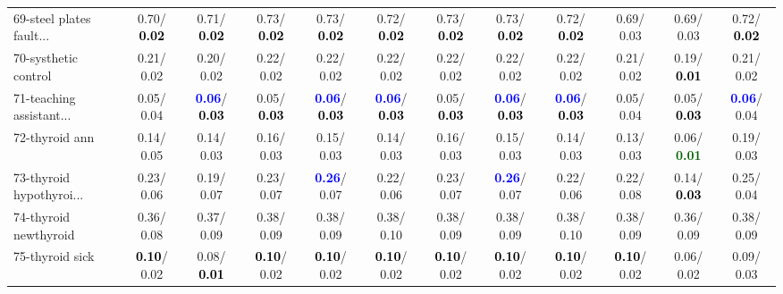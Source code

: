 \begin{table}[h]
\begin{center}
{\begin{tabular}{lc|c|c|c|c|c|c|c|c|c|c}
69-steel plates fault... &   0.70/\textcolor{black}{\textbf{  0.02}} &   0.71/\textcolor{black}{\textbf{  0.02}} &   0.73/\textcolor{black}{\textbf{  0.02}} &   0.73/\textcolor{black}{\textbf{  0.02}} &   0.72/\textcolor{black}{\textbf{  0.02}} &   0.73/\textcolor{black}{\textbf{  0.02}} &   0.73/\textcolor{black}{\textbf{  0.02}} &   0.72/\textcolor{black}{\textbf{  0.02}} &   0.69/  0.03 &   0.69/  0.03 &   0.72/\textcolor{black}{\textbf{  0.02}} \\
70-systhetic control &   0.21/  0.02 &   0.20/  0.02 &   0.22/  0.02 &   0.22/  0.02 &   0.22/  0.02 &   0.22/  0.02 &   0.22/  0.02 &   0.22/  0.02 &   0.21/  0.02 &   0.19/\textcolor{black}{\textbf{  0.01}} &   0.21/  0.02 \\
71-teaching assistant... &   0.05/  0.04 & \textcolor{blue}{\textbf{  0.06}}/\textcolor{black}{\textbf{  0.03}} &   0.05/\textcolor{black}{\textbf{  0.03}} & \textcolor{blue}{\textbf{  0.06}}/\textcolor{black}{\textbf{  0.03}} & \textcolor{blue}{\textbf{  0.06}}/\textcolor{black}{\textbf{  0.03}} &   0.05/\textcolor{black}{\textbf{  0.03}} & \textcolor{blue}{\textbf{  0.06}}/\textcolor{black}{\textbf{  0.03}} & \textcolor{blue}{\textbf{  0.06}}/\textcolor{black}{\textbf{  0.03}} &   0.05/  0.04 &   0.05/\textcolor{black}{\textbf{  0.03}} & \textcolor{blue}{\textbf{  0.06}}/  0.04 \\ \hline
72-thyroid ann &   0.14/  0.05 &   0.14/  0.03 &   0.16/  0.03 &   0.15/  0.03 &   0.14/  0.03 &   0.16/  0.03 &   0.15/  0.03 &   0.14/  0.03 &   0.13/  0.03 &   0.06/\textcolor{darkgreen}{\textbf{  0.01}} &   0.19/  0.03 \\
73-thyroid hypothyroi... &   0.23/  0.06 &   0.19/  0.07 &   0.23/  0.07 & \textcolor{blue}{\textbf{  0.26}}/  0.07 &   0.22/  0.06 &   0.23/  0.07 & \textcolor{blue}{\textbf{  0.26}}/  0.07 &   0.22/  0.06 &   0.22/  0.08 &   0.14/\textcolor{black}{\textbf{  0.03}} &   0.25/  0.04 \\
74-thyroid newthyroid &   0.36/  0.08 &   0.37/  0.09 &   0.38/  0.09 &   0.38/  0.09 &   0.38/  0.10 &   0.38/  0.09 &   0.38/  0.09 &   0.38/  0.10 &   0.38/  0.09 &   0.36/  0.09 &   0.38/  0.09 \\
75-thyroid sick & \textcolor{black}{\textbf{  0.10}}/  0.02 &   0.08/\textcolor{black}{\textbf{  0.01}} & \textcolor{black}{\textbf{  0.10}}/  0.02 & \textcolor{black}{\textbf{  0.10}}/  0.02 & \textcolor{black}{\textbf{  0.10}}/  0.02 & \textcolor{black}{\textbf{  0.10}}/  0.02 & \textcolor{black}{\textbf{  0.10}}/  0.02 & \textcolor{black}{\textbf{  0.10}}/  0.02 & \textcolor{black}{\textbf{  0.10}}/  0.02 &   0.06/  0.02 &   0.09/  0.03 \\

\end{tabular}}
\end{center}
\end{table}
